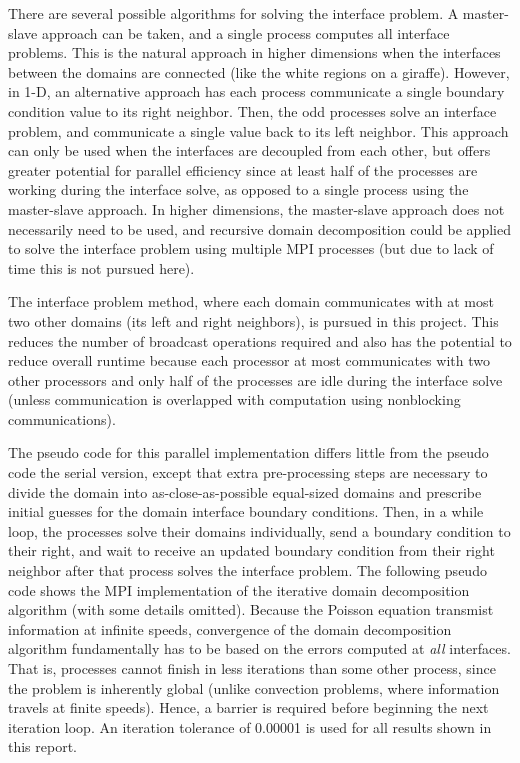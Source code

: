\documentclass[10pt]{article}
\begin{document}
\begin{enumerate}
There are several possible algorithms for solving the interface problem. A master-slave approach can be taken, and a single process computes all interface problems. This is the natural approach in higher dimensions when the interfaces between the domains are connected (like the white regions on a giraffe). However, in 1-D, an alternative approach has each process communicate a single boundary condition value to its right neighbor. Then, the odd processes solve an interface problem, and communicate a single value back to its left neighbor. This approach can only be used when the interfaces are decoupled from each other, but offers greater potential for parallel efficiency since at least half of the processes are working during the interface solve, as opposed to a single process using the master-slave approach. In higher dimensions, the master-slave approach does not necessarily need to be used, and recursive domain decomposition could be applied to solve the interface problem using multiple MPI processes (but due to lack of time this is not pursued here).
\end{enumerate}

The interface problem method, where each domain communicates with at most two other domains (its left and right neighbors), is pursued in this project. This reduces the number of broadcast operations required and also has the potential to reduce overall runtime because each processor at most communicates with two other processors and only half of the processes are idle during the interface solve (unless communication is overlapped with computation using nonblocking communications). 

The pseudo code for this parallel implementation differs little from the pseudo code the serial version, except that extra pre-processing steps are necessary to divide the domain into as-close-as-possible equal-sized domains and prescribe initial guesses for the domain interface boundary conditions. Then, in a while loop, the processes solve their domains individually, send a boundary condition to their right, and wait to receive an updated boundary condition from their right neighbor after that process solves the interface problem. The following pseudo code shows the MPI implementation of the iterative domain decomposition algorithm (with some details omitted). Because the Poisson equation transmist information at infinite speeds, convergence of the domain decomposition algorithm fundamentally has to be based on the errors computed at {\it all} interfaces. That is, processes cannot finish in less iterations than some other process, since the problem is inherently global (unlike convection problems, where information travels at finite speeds). Hence, a barrier is required before beginning the next iteration loop. An iteration tolerance of 0.00001 is used for all results shown in this report.
\end{document}
